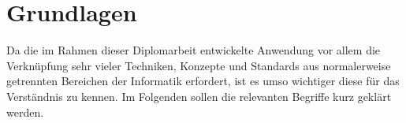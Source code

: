 \chapter{Grundlagen}

Da die im Rahmen dieser Diplomarbeit entwickelte Anwendung vor allem die  Verknüpfung sehr vieler
Techniken, Konzepte und Standards aus normalerweise  getrennten Bereichen der Informatik erfordert,
ist es umso wichtiger diese für  das Verständnis zu kennen. Im Folgenden sollen die relevanten
Begriffe kurz geklärt werden.





